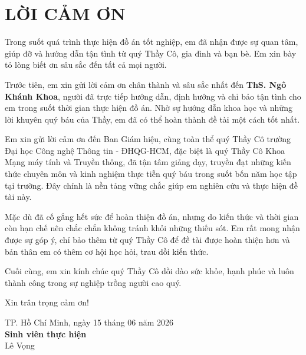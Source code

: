 \chapter*{\centering\Large{LỜI CẢM ƠN}}

Trong suốt quá trình thực hiện đồ án tốt nghiệp, em đã nhận được sự quan tâm, giúp đỡ và hướng dẫn tận tình từ quý Thầy Cô, gia đình và bạn bè. Em xin bày tỏ lòng biết ơn sâu sắc đến tất cả mọi người.

Trước tiên, em xin gửi lời cảm ơn chân thành và sâu sắc nhất đến \textbf{ThS. Ngô Khánh Khoa}, người đã trực tiếp hướng dẫn, định hướng và chỉ bảo tận tình cho em trong suốt thời gian thực hiện đồ án. Nhờ sự hướng dẫn khoa học và những lời khuyên quý báu của Thầy, em đã có thể hoàn thành đề tài một cách tốt nhất.

Em xin gửi lời cảm ơn đến Ban Giám hiệu, cùng toàn thể quý Thầy Cô trường Đại học Công nghệ Thông tin - ĐHQG-HCM, đặc biệt là quý Thầy Cô Khoa Mạng máy tính và Truyền thông, đã tận tâm giảng dạy, truyền đạt những kiến thức chuyên môn và kinh nghiệm thực tiễn quý báu trong suốt bốn năm học tập tại trường. Đây chính là nền tảng vững chắc giúp em nghiên cứu và thực hiện đề tài này.

Mặc dù đã cố gắng hết sức để hoàn thiện đồ án, nhưng do kiến thức và thời gian còn hạn chế nên chắc chắn không tránh khỏi những thiếu sót. Em rất mong nhận được sự góp ý, chỉ bảo thêm từ quý Thầy Cô để đề tài được hoàn thiện hơn và bản thân em có thêm cơ hội học hỏi, trau dồi kiến thức.

Cuối cùng, em xin kính chúc quý Thầy Cô dồi dào sức khỏe, hạnh phúc và luôn thành công trong sự nghiệp trồng người cao quý.

Xin trân trọng cảm ơn!

\begin{flushright}
TP. Hồ Chí Minh, ngày 15 tháng 06 năm 2026 \\
\textbf{Sinh viên thực hiện} \\
Lê Vọng
\end{flushright}
